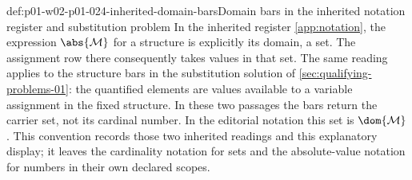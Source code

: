 \begin{hbconvention}{def:p01-w02-p01-024-inherited-domain-bars}{Domain bars in the inherited notation register and substitution problem}
In the inherited register \cref{app:notation}, the expression
\(\abs{\mathcal M}\) for a structure is explicitly its domain, a set.
The assignment row there consequently takes values in that set.
The same reading applies to the structure bars in the substitution
solution of \cref{sec:qualifying-problems-01}: the quantified elements
are values available to a variable assignment in the fixed structure.
In these two passages the bars return the carrier set, not its cardinal
number.  In the editorial notation this set is \(\dom{\mathcal M}\).
This convention records those two inherited readings and this explanatory
display; it leaves the cardinality notation for sets and the absolute-value
notation for numbers in their own declared scopes.
\end{hbconvention}

